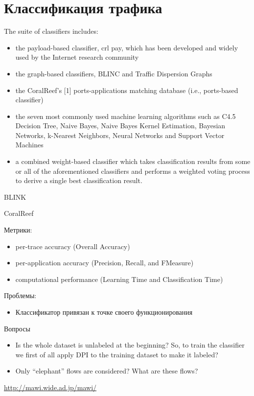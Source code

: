 \documentclass{report}
\numberwithin{theorem}{chapter}
\numberwithin{statement}{chapter}
\numberwithin{lemma}{chapter}
\theoremstyle{definition}
\numberwithin{task}{chapter}
\theoremstyle{remark}
\numberwithin{example}{chapter}
\theoremstyle{definition}
\numberwithin{definition}{chapter}
\theoremstyle{remark}
\theoremstyle{remark}
\numberwithin{lyrics}{section}
\begin{document}
\chapter{Классификация трафика}
The suite of classifiers includes:
\begin{itemize}
	\item the payload-based classifier, crl pay, which has been developed and widely
	used by the Internet research community
	\item the graph-based classifiers, BLINC and Traffic Dispersion Graphs
	\item the CoralReef’s [1] ports-applications matching database (i.e., ports-based classifier)
	\item the seven most commonly used machine learning algorithms such as C4.5 Decision Tree, Naive Bayes, Naive Bayes Kernel Estimation,
	Bayesian Networks, k-Nearest Neighbors, Neural Networks and Support Vector Machines
	\item a combined weight-based classifier which takes classification results from some or all of the aforementioned classifiers and performs a
	weighted voting process to derive a single best classification result.
\end{itemize}

BLINK

CoralReef

Метрики:
\begin{itemize}
	\item per-trace accuracy (Overall Accuracy)
	\item per-application accuracy (Precision, Recall, and FMeasure)
	\item computational performance (Learning Time
	and Classification Time)
\end{itemize}

Проблемы:
\begin{itemize}
	\item Классификатор привязан к точке своего функционирования
\end{itemize}

Вопросы
\begin{itemize}
	\item Is the whole dataset is unlabeled at the beginning? So, to train the classifier we first of all apply DPI to the training dataset to make it labeled?
	\item Only ``elephant'' flows are considered? What are these flows?
\end{itemize}

\url{http://mawi.wide.ad.jp/mawi/}



\end{document}
